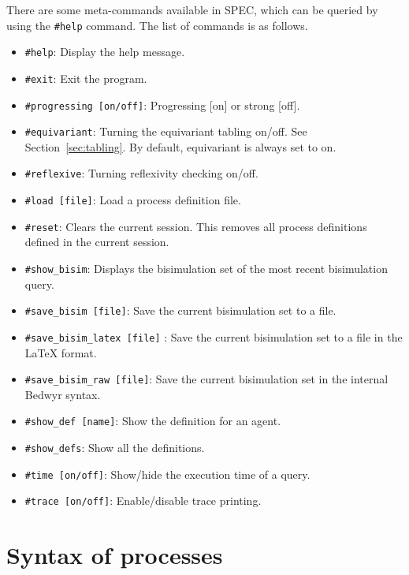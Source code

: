 \documentclass{article}
\newcommand\obj[1]{\texttt{#1}}
\begin{document}
There are some meta-commands available in SPEC, which can be queried by 
using the \texttt{\#help} command. The list of commands is as follows. 
\begin{itemize}
\item \obj{\#help}: Display the help message.
\item \obj{\#exit}: Exit the program.
\item \obj{\#progressing [on/off]}: Progressing [on] or strong [off].
\item \obj{\#equivariant}: Turning the equivariant tabling on/off. See Section~\ref{sec:tabling}.
By default, equivariant is always set to on.
\item \obj{\#reflexive}: Turning reflexivity checking on/off. 
\item \obj{\#load [file]}: Load a process definition file.
\item \obj{\#reset}: Clears the current session. This removes all process definitions defined
in the current session. 
\item \obj{\#show\_bisim}: Displays the bisimulation set of the most recent 
bisimulation query. 
\item \obj{\#save\_bisim [file]}: Save the current bisimulation set to a file. 
\item \obj{\#save\_bisim\_latex [file]} : Save the current bisimulation set to 
                          a file in the LaTeX format. 
\item \obj{\#save\_bisim\_raw [file]}:   Save the current bisimulation set in 
                          the internal Bedwyr syntax. 
\item \obj{\#show\_def [name]}:          Show the definition for an agent. 
\item \obj{\#show\_defs}:               Show all the definitions. 
\item \obj{\#time [on/off]}:            Show/hide the execution time of a query.
\item \obj{\#trace [on/off]}: Enable/disable trace printing.
\end{itemize}

\section{Syntax of processes}
\label{sec:syntax}
\end{document}
